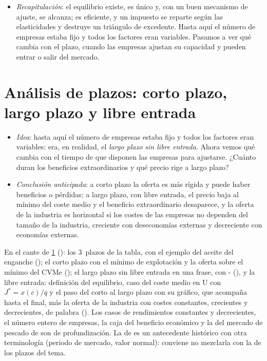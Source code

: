 \documentclass[11pt]{article}
\begin{document}
\begin{itemize}
\item \emph{Recapitulación}: el equilibrio existe, es único y, con un buen mecanismo de ajuste, se alcanza; es eficiente, y un impuesto se reparte según las elasticidades y destruye un triángulo de excedente. Hasta aquí el número de empresas estaba fijo y todos los factores eran variables. Pasamos a ver qué cambia con el plazo, cuando las empresas ajustan su capacidad y pueden entrar o salir del mercado.
\end{itemize}


\section{Análisis de plazos: corto plazo, largo plazo\cortetitulo{} y libre entrada}\label{sec:analisis-plazos-corto}

\begin{itemize}
\item \emph{Idea}: hasta aquí el número de empresas estaba fijo y todos los factores eran variables: era, en realidad, el \emph{largo plazo sin libre entrada}. Ahora vemos qué cambia con el tiempo de que disponen las empresas para ajustarse. ¿Cuánto duran los beneficios extraordinarios y qué precio rige a largo plazo?
\item \emph{Conclusión anticipada}: a corto plazo la oferta es más rígida y puede haber beneficios o pérdidas; a largo plazo, con libre entrada, el precio baja al mínimo del coste medio y el beneficio extraordinario desaparece, y la oferta de la industria es horizontal si los costes de las empresas no dependen del tamaño de la industria, creciente con deseconomías externas y decreciente con economías externas.
\end{itemize}

\begin{notaopositor}
En el cante de \ref{sec:analisis-plazos-corto} (): los 3~plazos de la tabla, con el ejemplo del aceite del enganche (); el corto plazo con el mínimo de explotación y la oferta sobre el mínimo del CVMe (); el largo plazo sin libre entrada en una frase, con - (), y la libre entrada: definición del equilibrio, caso del coste medio en U con $J^*=x(\overline{c})/\overline{q}$ y el paso del corto al largo plazo con su gráfico, que acompaña hasta el final, más la oferta de la industria con costes constantes, crecientes y decrecientes, de palabra (). Los casos de rendimientos constantes y decrecientes, el número entero de empresas, la caja del beneficio económico y la del mercado de pescado de  son de profundización. La de  es un antecedente histórico con otra terminología (periodo de mercado, valor normal): conviene no mezclarla con la de los plazos del tema.
\end{notaopositor}
\end{document}
